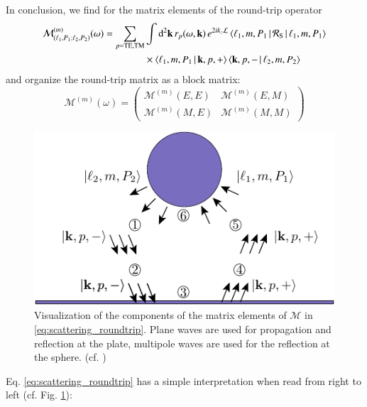 In conclusion, we find for the matrix elements of the round-trip operator
\begin{align}
\nonumber
\mathcal{M}^{(m)}_{(\ell_1,P_1;\ell_2,P_2)}(\omega) = \sum_{p={\mathrm{TE},\mathrm{TM}}} &\int \mathrm{d}^2 {\mathbf{k}} \, r_p(\omega,{\mathbf{k}}) \, e^{2 i k_z \mathcal{L}} \braket{\ell_1,m,P_1 \, | \, \mathcal{R}_\text{S} \, | \, \ell_1,m,P_1}\\
\label{eq:scattering_roundtrip}
&\times \braket{\ell_1,m,P_1 \, | \, {\mathbf{k}}, p, +} \braket{{\mathbf{k}}, p, - \, | \, \ell_2,m,P_2}
\end{align}
and organize the round-trip matrix as a block matrix:
\begin{equation}
\mathcal{M}^{(m)}(\omega) = \left(\begin{array}{cc}
\mathcal{M}^{(m)}(E,E) & \mathcal{M}^{(m)}(E,M) \\
\mathcal{M}^{(m)}(M,E) & \mathcal{M}^{(m)}(M,M)
\end{array}
\right)
\end{equation}


\begin{figure}
\begin{center}
\includegraphics[scale=1.8]{images/roundtrip.pdf}
\end{center}
\caption{
Visualization of the components of the matrix elements of $\mathcal{M}$ in \eqref{eq:scattering_roundtrip}. Plane waves are used for propagation
and reflection at the plate, multipole waves are used for the reflection at the sphere. (cf. \cite{Durand})}
\label{fig:scattering_roundtrip}
\end{figure}

Eq. \eqref{eq:scattering_roundtrip} has a simple interpretation when read
from right to left (cf. Fig. \ref{fig:scattering_roundtrip}):

